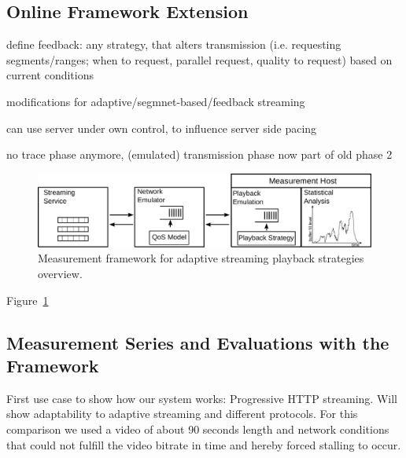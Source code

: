 \subsection{Online Framework Extension}

define feedback: any strategy, that alters transmission (i.e. requesting segments/ranges; when to request, parallel request, quality to request) based on current conditions

modifications for adaptive/segmnet-based/feedback streaming

can use server under own control, to influence server side pacing

no trace phase anymore, (emulated) transmission phase now part of old phase 2


\begin{figure}[htb]
    \includegraphics[width=\textwidth]{images/feedback-measurement-model.pdf}
    \caption{Measurement framework for adaptive streaming playback strategies overview.}
    \label{c3:fig:framework-feedback}
\end{figure}


Figure~\ref{c3:fig:framework-feedback}


\subsection{Measurement Series and Evaluations with the Framework}

First use case to show how our system works: Progressive HTTP streaming. Will show adaptability to adaptive streaming and different protocols. For this comparison we used a video of about 90 seconds length and network conditions that could not fulfill the video bitrate in time and hereby forced stalling to occur.

